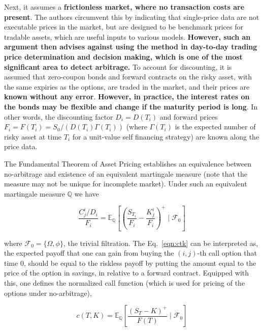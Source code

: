 \documentclass[12pt]{article}
\newcommand{\Q}{\mathbb{Q}}
\newcommand{\E}{\mathbb{E}}
\begin{document}
Next, it assumes a \textbf{frictionless market, where no transaction costs are present}. The authors circumvent this by indicating that single-price data are not executable prices in the market, but are designed to be benchmark prices for tradable assets, which are useful inputs to various models. \textbf{However, such an argument then advises against using the method in day-to-day trading price determination and decision making, which is one of the most significant area to detect arbitrage.} To account for discounting, it is assumed that zero-coupon bonds and forward contracts on the risky asset, with the same expiries as the options, are traded in the market, and their prices are \textbf{known without any error}. \textbf{However, in practice, the interest rates on the bonds may be flexible and change if the maturity period is long}. In other words, the discounting factor $D_i = D(T_i)$ and forward prices $F_i = F(T_i) = S_0/(D(T_i)\Gamma(T_i))$ (where $\Gamma(T_i)$ is the expected number of risky asset at time $T_i$ for a unit-value self financing strategy) are known along the price data. 

The Fundamental Theorem of Asset Pricing establishes an equivalence between no-arbitrage and existence of an equivalent martingale measure (note that the measure may not be unique for incomplete market). Under such an equivalent martingale measure $\Q$ we have 

\begin{equation}
    \dfrac{C_j^i / D_i}{F_i} = \E_{\Q} \left[ \left( \dfrac{S_{T_i}}{F_i}  - \dfrac{K_j^i}{F_i} \right)^+  \mid \mathcal{F}_0 \right] 
    \label{eqn:ctk}
\end{equation}

\noindent where $\mathcal{F}_0 = \{ \Omega, \phi \}$, the trivial filtration. The Eq.~\eqref{eqn:ctk} can be interpreted as, the expected payoff that one can gain from buying the $(i,j)$-th call option that time $0$, should be equal to the riskless payoff by putting the amount equal to the price of the option in savings, in relative to a forward contract. Equipped with this, one defines the normalized call function (which is used for pricing of the options under no-arbitrage), 

\begin{equation*}
    c(T, K) = \E_{\Q} \left[ \dfrac{\left( S_T - K \right)^+}{F(T)} \mid \mathcal{F}_0 \right]
\end{equation*}
\end{document}
